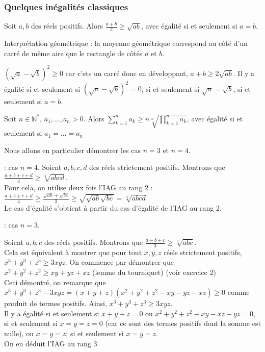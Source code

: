 \subsubsection{Quelques inégalités classiques}
\begin{pro} [Inégalité arithmético géométrique, cas $n=2$]
Soit $a, b$ des réels positifs. Alors $\frac{a+b}{2} \geqslant \sqrt{ab}$, avec égalité si et seulement si $a=b$.
\end{pro}

Interprétation géométrique : la moyenne géométrique correspond au côté d'un carré de même aire que le rectangle de côtés $a$ et $b$.

\begin{preuve}
$(\sqrt{a}-\sqrt{b} )^2 \geqslant 0$ car c'ets un carré donc en développant, $a+b \geqslant 2\sqrt{ab}$. Il y a égalité si et seulement si $(\sqrt{a} - \sqrt{b})^2 = 0$, si et seulement si $\sqrt{a} = \sqrt{b}$, si et seulement si $a=b$.
\end{preuve}

\begin{pro} 
Soit $n\in \mathbb{N^*}$, $a_1,\dots, a_n >0$. Alors $\sum_{k=1}^n a_k \geqslant n\sqrt[n]{\prod_{k=1}^na_k}$, avec égalité si et seulement si $a_1=\dots=a_n$
\end{pro}

Nous allons en particulier démontrer les cas $n=3$ et $n=4$.

\begin{preuve} : cas $n=4$.
Soient $a, b, c, d$ des réels strictement positifs. Montrons que $\frac{a+b+c+d}{4} \geqslant \sqrt[4]{abcd}$. \\ Pour cela, on utilise deux fois l'IAG au rang $2$ : $\frac{a+b+c+d}{4} \geqslant \frac{\sqrt{ab}+\sqrt{bc}}{2} \geqslant \sqrt{\sqrt{ab}\sqrt{bc}} = \sqrt[4]{abcd}$\\ Le cas d'égalité s'obtient à partir du cas d'égalité de l'IAG au rang $2$.
\end{preuve}

\begin{preuve} : cas $n=3$.

Soient $a, b, c$ des réels positifs. Montrons que $\frac{a+b+c}{3} \geqslant \sqrt[3]{abc}$. \\ Cela est équivalent à montrer que pour tout $x, y,z$ réels strictement positifs, $x^3+y^3+z^3 \geqslant 3xyz$. On commence par démontrer que $x^2+y^2+z^2 \geqslant xy+yz+xz$ (lemme du tourniquet) (voir exercice 2)\\ Ceci démontré, on remarque que $x^3+y^3+z^3-3xyz = (x+y+z)(x^2+y^2+z^2-xy-yz-xz) \geqslant 0$ comme produit de termes positifs. Ainsi, $x^3+y^3+z^3 \geqslant 3xyz$. \\ Il y a égalité si et seulement si $x+y+z = 0$ ou $x^2+y^2+z^2 - xy-xz-yz = 0$, si et seulement si $x=y=z=0$ (car ce sont des termes positifs dont la somme est nulle), ou $x=y=z$; si et seulement si $x=y=z$. \\ On en déduit l'IAG au rang $3$
\end{preuve}


